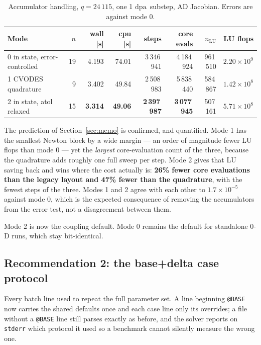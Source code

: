 \documentclass[11pt,a4paper]{article}
\newcommand{\code}[1]{\texttt{\small #1}}
\newcommand{\dpa}{\ensuremath{\mathrm{dpa}}}
\begin{document}
\begin{table}[htb]
\centering
\caption{Accumulator handling, $q=24\,115$, one 1 \dpa\ substep, AD Jacobian.
Errors are against mode 0.}
\label{tab:rec1}
\begin{tabular}{lrrrrrrr}
\toprule
Mode & $n$ & wall [s] & cpu [s] & steps & core evals & $n_{\mathrm{LU}}$ & LU flops \\
\midrule
0 in state, error-controlled & 19 & 4.193 & 74.01 & 3\,346\,941 & 4\,184\,924 & 961\,510 & $2.20\times10^{9}$ \\
1 CVODES quadrature          &  9 & 3.402 & 49.84 & 2\,508\,983 & 5\,838\,440 & 584\,867 & $1.42\times10^{8}$ \\
2 in state, atol relaxed     & 15 & \textbf{3.314} & \textbf{49.06} & \textbf{2\,397\,987} & \textbf{3\,077\,945} & 507\,161 & $5.71\times10^{8}$ \\
\bottomrule
\end{tabular}
\end{table}

The prediction of Section~\ref{sec:memo} is confirmed, and quantified. Mode 1
has the smallest Newton block by a wide margin --- an order of magnitude fewer
LU flops than mode 0 --- yet the \emph{largest} core-evaluation count of the
three, because the quadrature adds roughly one full sweep per step. Mode 2
gives that LU saving back and wins where the cost actually is: \textbf{26\%
fewer core evaluations than the legacy layout and 47\% fewer than the
quadrature}, with the fewest steps of the three. Modes 1 and 2 agree with each
other to $1.7\times10^{-5}$ against mode 0, which is the expected consequence of
removing the accumulators from the error test, not a disagreement between them.

Mode 2 is now the coupling default. Mode 0 remains the default for standalone
0-D runs, which stay bit-identical.

\subsection{Recommendation 2: the base+delta case protocol}

Every batch line used to repeat the full parameter set. A line beginning
\code{@BASE} now carries the shared defaults once and each case line only its
overrides; a file without a \code{@BASE} line still parses exactly as before,
and the solver reports on \code{stderr} which protocol it used so a benchmark
cannot silently measure the wrong one.
\end{document}
